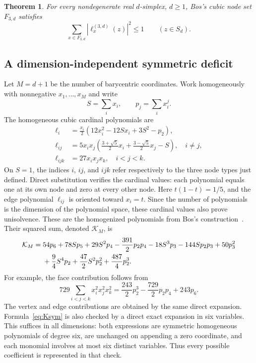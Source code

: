 \documentclass[11pt,a4paper]{article}
\newtheorem{theorem}{Theorem}[section]
\theoremstyle{remark}
\begin{document}
\begin{theorem}\label{thm:cubic}
For every nondegenerate real $d$-simplex, $d\ge1$, Bos's cubic node set $F_{3,d}$ satisfies
\[
 \sum_{x\in F_{3,d}}|\ell_x^{(3,d)}(z)|^2\le1
 \qquad(z\in S_d).
\]
\end{theorem}

\subsection{A dimension-independent symmetric deficit}

Let $M=d+1$ be the number of barycentric coordinates. Work homogeneously with nonnegative $x_1,\ldots,x_M$ and write
\[
 S=\sum_i x_i,\qquad p_j=\sum_i x_i^j.
\]
The homogeneous cubic cardinal polynomials are
\begin{align}
 \ell_i&=\frac{x_i}{2}(12x_i^2-12Sx_i+3S^2-p_2),\label{eq:cubicvertex}\\
 \ell_{ij}&=5x_ix_j\left(\frac{3+\sqrt5}{2}x_i+
                 \frac{3-\sqrt5}{2}x_j-S\right),\quad i\ne j,
                 \label{eq:cubicedge}\\
 \ell_{ijk}&=27x_ix_jx_k,\quad i<j<k.\label{eq:cubicface}
\end{align}
On $S=1$, the indices $i$, $ij$, and $ijk$ refer respectively to the three node types just defined. Direct substitution verifies the cardinal values: each polynomial equals one at its own node and zero at every other node. Here $t(1-t)=1/5$, and the edge polynomial $\ell_{ij}$ is oriented toward $x_i=t$. Since the number of polynomials is the dimension of the polynomial space, these cardinal values also prove unisolvence. These are the homogenized polynomials from Bos's construction~\cite[Section 3]{bos}. Their squared sum, denoted $\mathcal K_M$, is
\begin{align}\label{eq:Ksym}
 \mathcal K_M={}&54p_6+78Sp_5+29S^2p_4-\frac{391}{2}p_2p_4
 -18S^3p_3-144Sp_2p_3+50p_3^2\notag\\
 &+\frac94S^4p_2+\frac{47}{2}S^2p_2^2+\frac{487}{4}p_2^3.
\end{align}
For example, the face contribution follows from
\[
 729\sum_{i<j<k}x_i^2x_j^2x_k^2
 =\frac{243}{2}p_2^3-\frac{729}{2}p_2p_4+243p_6.
\]
The vertex and edge contributions are obtained by the same direct expansion. Formula~\eqref{eq:Ksym} is also checked by a direct exact expansion in six variables. This suffices in all dimensions: both expressions are symmetric homogeneous polynomials of degree six, are unchanged on appending a zero coordinate, and each monomial involves at most six distinct variables. Thus every possible coefficient is represented in that check.
\end{document}
